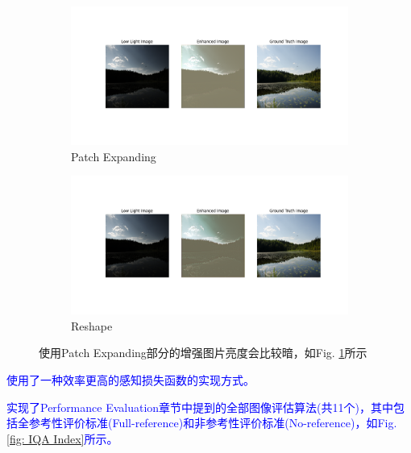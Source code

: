 \documentclass[a4paper]{ctexart}
\begin{document}
		\begin{figure}[htbp]
			\centering
			\begin{subfigure}{0.6\textwidth}
				\includegraphics[width=\linewidth]{picture/LLIE/Experiment/myplot}
				\captionsetup{font=scriptsize}
				\caption{Patch Expanding}
				\label{fig: Expanding}
			\end{subfigure}
			\begin{subfigure}{0.6\textwidth}
				\includegraphics[width=\linewidth]{picture/LLIE/Experiment/myplot1}
				\captionsetup{font=scriptsize}
				\caption{Reshape}
				\label{fig: Reshape}	
			\end{subfigure}
			\caption{
				\label{fig: Embed Expanding and reshape}
				使用Patch Expanding部分的增强图片亮度会比较暗，如Fig. \ref{fig: Expanding}所示
			}
		\end{figure}
		
		\textcolor{blue}{使用了一种效率更高的感知损失函数的实现方式。}
	
		\textcolor{blue}{实现了Performance Evaluation章节中提到的全部图像评估算法(共11个)，其中包括全参考性评价标准(Full-reference)和非参考性评价标准(No-reference)，如Fig. \ref{fig: IQA Index}所示。}
		
\end{document}
